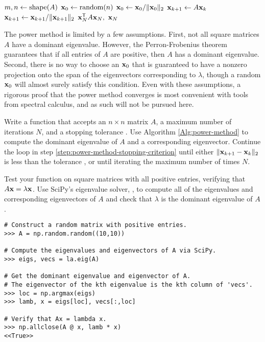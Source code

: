 \begin{algorithm}[H] %
\begin{algorithmic}[1]
    \State $m, n \gets \mathrm{shape}(A)$
    \State $\mathbf{x}_0 \gets \text{random}(n)$
    \State $\mathbf{x}_0 \gets \mathbf{x}_0/\|\mathbf{x}_0\|_2$
        \label{step:power-method-stopping-criterion}
        \State $\mathbf{x}_{k+1} \gets A\mathbf{x}_k$
        \label{step:power-method-main-step}
        \State $\mathbf{x}_{k+1} \gets \mathbf{x}_{k+1}/\|\mathbf{x}_{k+1}\|_2$
    \EndFor
    \State {} $\mathbf{x}_N^{\mathsf T} A \mathbf{x}_N,\ \mathbf{x}_N$
\EndProcedure
\end{algorithmic}
\caption{}
\label{Alg:power-method}
\end{algorithm}

The power method is limited by a few assumptions.
First, not all square matrices $A$ have a dominant eigenvalue.
However, the Perron-Frobenius theorem guarantees that if all entries of $A$ are positive, then $A$ has a dominant eigenvalue.
Second, there is no way to choose an $\mathbf{x}_0$ that is guaranteed to have a nonzero projection onto the span of the eigenvectors corresponding to $\lambda$, though a random $\mathbf{x}_0$ will almost surely satisfy this condition.
Even with these assumptions, a rigorous proof that the power method converges is most convenient with tools from spectral calculus, and as such will not be pursued here.

\begin{problem} %
Write a function that accepts an $n \times n$ matrix $A$, a maximum number of iterations $N$, and a stopping tolerance .
Use Algorithm \ref{Alg:power-method} to compute the dominant eigenvalue of $A$ and a corresponding eigenvector.
Continue the loop in step \ref{step:power-method-stopping-criterion} until either $\|\mathbf{x}_{k+1} - \mathbf{x}_k\|_2$ is less than the tolerance , or until iterating the maximum number of times $N$.

Test your function on square matrices with all positive entries, verifying that $A\mathbf{x} = \lambda\mathbf{x}$.
Use SciPy's eigenvalue solver, , to compute all of the eigenvalues and corresponding eigenvectors of $A$ and check that $\lambda$ is the dominant eigenvalue of $A$.

\begin{lstlisting}
# Construct a random matrix with positive entries.
>>> A = np.random.random((10,10))

# Compute the eigenvalues and eigenvectors of A via SciPy.
>>> eigs, vecs = la.eig(A)

# Get the dominant eigenvalue and eigenvector of A.
# The eigenvector of the kth eigenvalue is the kth column of 'vecs'.
>>> loc = np.argmax(eigs)
>>> lamb, x = eigs[loc], vecs[:,loc]

# Verify that Ax = lambda x.
>>> np.allclose(A @ x, lamb * x)
<<True>>
\end{lstlisting}
\end{problem}

